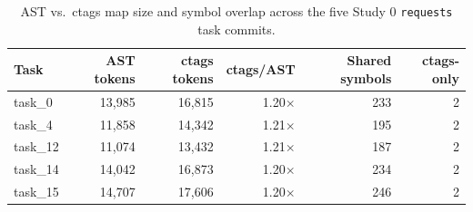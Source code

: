 
\begin{table}[htbp]
\centering
\caption{AST vs.\ ctags map size and symbol overlap across the five Study 0 \texttt{requests} task commits.}
\label{tab:ast-ctags-token-comparison}
\begin{tabular}{@{}l r r r r r@{}}
\toprule
Task & AST tokens & ctags tokens & ctags/AST & Shared symbols & ctags-only \\
\midrule
task\_0  & 13{,}985 & 16{,}815 & 1.20$\times$ & 233 & 2 \\
task\_4  & 11{,}858 & 14{,}342 & 1.21$\times$ & 195 & 2 \\
task\_12 & 11{,}074 & 13{,}432 & 1.21$\times$ & 187 & 2 \\
task\_14 & 14{,}042 & 16{,}873 & 1.20$\times$ & 234 & 2 \\
task\_15 & 14{,}707 & 17{,}606 & 1.20$\times$ & 246 & 2 \\
\bottomrule
\end{tabular}
\end{table}
